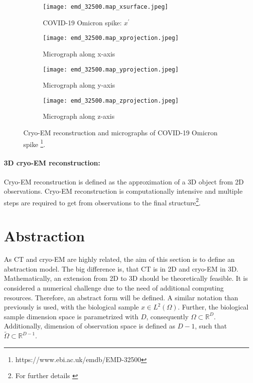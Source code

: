 \begin{figure}[H]
    \captionsetup[subfigure]{justification=centering}
    \centering
    \begin{subfigure}[t]{0.2\textwidth}
        \texttt{[image: emd\_32500.map\_xsurface.jpeg]}
        \caption{COVID-19 Omicron spike: $x^{\prime}$}
    \end{subfigure} \hfill
    \begin{subfigure}[t]{0.2\textwidth}
      \texttt{[image: emd\_32500.map\_xprojection.jpeg]}
      \caption{Micrograph along x-axis}
    \end{subfigure}\hfill
    \begin{subfigure}[t]{0.2\textwidth}
      \texttt{[image: emd\_32500.map\_yprojection.jpeg]}
      \caption{Micrograph along y-axis}
    \end{subfigure}\hfill
    \begin{subfigure}[t]{0.2\textwidth}
        \texttt{[image: emd\_32500.map\_zprojection.jpeg]}
        \caption{Micrograph along z-axis}
      \end{subfigure}
    \caption{Cryo-EM reconstruction and micrographs of COVID-19 Omicron spike \protect\footnote{https://www.ebi.ac.uk/emdb/EMD-32500}.}
    \label{fig:cryo-em-omicron}
  \end{figure}


\paragraph{3D cryo-EM reconstruction:}
Cryo-EM reconstruction is defined as the approximation of a 3D object from 2D observations.
Cryo-EM reconstruction is computationally intensive and multiple steps are required to get from 
observations to the final structure\footnote{For further details \cite{singleParticleCryoEm, cryoEmMath}}.


\section{Abstraction}
As CT and cryo-EM are highly related, the aim of this section is to define
an abstraction model. The big difference is, that CT is in 2D and cryo-EM in 3D.
Mathematically, an extension from 2D to 3D should be theoretically feasible. 
It is considered a numerical challenge due to the need of additional computing resources.
Therefore, an abstract form will be defined.
A similar notation than previously is used, with the biological sample $x \in L^2(\Omega)$.
Further, the biological sample dimension space is parametrized with $D$, consequently $\Omega \subset \mathbb{R}^D$.
Additionally, dimension of observation space is defined as $D-1$, such that 
$\tilde{\Omega} \subset \mathbb{R}^{D-1}$.


